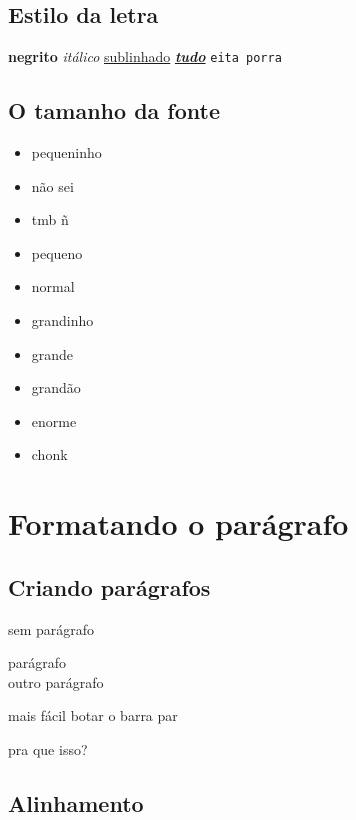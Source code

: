 \documentclass[12pt]{report}
\begin{document}
			\subsection{Estilo da letra}
			
				\textbf{negrito}
				\textit{itálico}			
				\underline{sublinhado}
				\textbf{\textit{\underline{tudo}}}
				\texttt{eita porra}
			
			\subsection{O tamanho da fonte}
			 
				\begin{itemize}
					\item \tiny pequeninho
					\item \scriptsize não sei
					\item \footnotesize tmb ñ
					\item \small pequeno
					\item \normalsize normal
					\item \large grandinho
					\item \Large grande
					\item \LARGE grandão
					\item \huge enorme
					\item \Huge chonk
				\end{itemize}
			
		\section{Formatando o parágrafo}
		
			\subsection{Criando parágrafos}
			
				sem parágrafo
				\par parágrafo\\
				\indent outro parágrafo
				\par mais fácil botar o barra par
				\par\noindent pra que isso?
			
			\subsection{Alinhamento}
			
			
\end{document}
